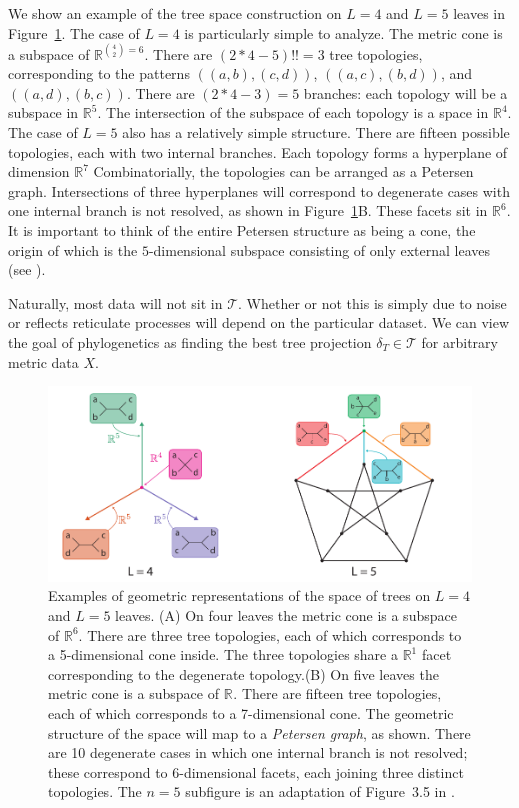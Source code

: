 We show an example of the tree space construction on $L=4$ and $L=5$ leaves in Figure~\ref{fig:bg:tree_space}.
The case of $L=4$ is particularly simple to analyze.
The metric cone is a subspace of $\mathbb{R}^{\binom{4}{2}=6}$.
There are $(2*4-5)!!=3$ tree topologies, corresponding to the patterns $((a,b),(c,d))$, $((a,c),(b,d))$, and $((a,d),(b,c))$.
There are $(2*4-3)=5$ branches: each topology will be a subspace in $\mathbb{R}^5$.
The intersection of the subspace of each topology is a space in $\mathbb{R}^4$.
The case of $L=5$ also has a relatively simple structure.
There are fifteen possible topologies, each with two internal branches.
Each topology forms a hyperplane of dimension $\mathbb{R}^7$
Combinatorially, the topologies can be arranged as a Petersen graph.
Intersections of three hyperplanes will correspond to degenerate cases with one internal branch is not resolved, as shown in Figure~\ref{fig:bg:tree_space}B.
These facets sit in $\mathbb{R}^6$.
It is important to think of the entire Petersen structure as being a cone, the origin of which is the $5$-dimensional subspace consisting of only external leaves (see \cite[Figure~14]{Billera:2001tv}).

Naturally, most data will not sit in $\mathcal{T}$.
Whether or not this is simply due to noise or reflects reticulate processes will depend on the particular dataset.
We can view the goal of phylogenetics as finding the best tree projection $\delta_{T} \in \mathcal{T}$ for arbitrary metric data $X$.

\begin{figure}
\centering
\includegraphics[]{fig/background/tree_space.pdf}
\caption[Tree Space]{Examples of geometric representations of the space of trees on $L=4$ and $L=5$ leaves. (A) On four leaves the metric cone is a subspace of $\mathbb{R}^{6}$. There are three tree topologies, each of which corresponds to a 5-dimensional cone inside. The three topologies share a $\mathbb{R}^1$ facet corresponding to the degenerate topology.(B) On five leaves the metric cone is a subspace of $\mathbb{R}^{}$. There are fifteen tree topologies, each of which corresponds to a 7-dimensional cone. The geometric structure of the space will map to a \emph{Petersen graph}, as shown. There are 10 degenerate cases in which one internal branch is not resolved; these correspond to 6-dimensional facets, each joining three distinct topologies. The $n=5$ subfigure is an adaptation of Figure~3.5 in \cite[Ch~3]{Pachter:2005vo}.}
\label{fig:bg:tree_space}
\end{figure}

